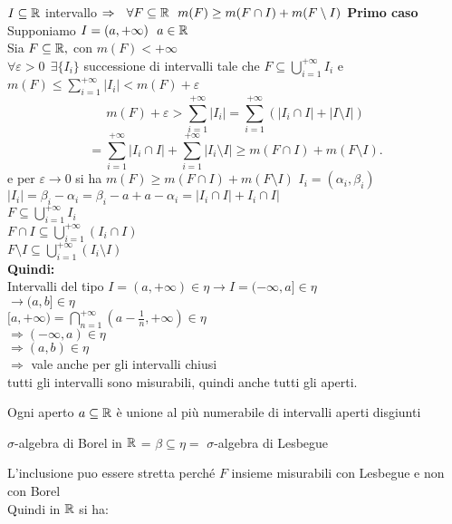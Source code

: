 \documentclass[12px]{article}
\begin{document}
\begin{dimo}
	$I\subseteq \mathbb{R}$ intervallo  $ \Rightarrow \ \ \forall F\subseteq \mathbb{R} \ \ m(F)\geq m(F\cap I) + m(F\setminus I)$ 
\textbf{Primo caso}\\
Supponiamo $I = (a,+\infty) \ \ a\in\R$\\
Sia  $F\subseteq \mathbb{R}, $ con $m(F) < +\infty$ \\
$\forall \varepsilon > 0 \ \ \exists \{I_i\}$ successione di intervalli tale che  $F\subseteq \bigcup^{+\infty}_{i=1}I_i$ e $m(F)\leq \sum^{+\infty}_{i=1}|I_i| < m(F) + \varepsilon$
\[
m(F) + \varepsilon > \sum^{+\infty}_{i =1}|I_i| = \sum^{+\infty}_{i=1}(|I_i\cap I| + |I\setminus I|) 
\] 
\[
= \sum^{+\infty}_{i=1}|I_i\cap I| + \sum^{+\infty}_{i=1}|I_i\setminus I| \geq m(F\cap I) + m(F\setminus I)
.\] 
e per $\varepsilon \rightarrow 0$ si ha $m(F) \geq m(F\cap I) + m(F\setminus I)$
$I_i  = (\alpha_i, \beta_i)$ \ \ $|I_i| = \beta_i -\alpha_i = \beta_i - a + a - \alpha_i = |I_i\cap I| + I_i\cap I|$\\
$F\subseteq \bigcup^{+\infty}_{i = 1}I_i$\\
$F\cap I\subseteq  \bigcup^{+\infty}_{i =1}(I_i\cap I)$\\
$F\setminus I \subseteq \bigcup^{+\infty}_{i =1}(I_i\setminus I)$ \\
\textbf{Quindi:}\\
Intervalli del tipo $I= (a,+\infty)\in \eta \rightarrow I = (-\infty, a]\in\eta$\\
$ \rightarrow (a,b]\in\eta$\\
$[a,+\infty) = \bigcap_{n=1}^{+\infty}(a - \frac 1n, +\infty)\in \eta$\\
$ \Rightarrow (-\infty , a)\in \eta$ \\
$ \Rightarrow (a,b)\in \eta$ \\
$ \Rightarrow $ vale anche per gli intervalli chiusi\\
tutti gli intervalli sono misurabili, quindi anche tutti gli aperti.
\end{dimo}
\begin{teo}
	Ogni aperto $a\subseteq\mathbb{R}$ è unione al più numerabile di intervalli aperti disgiunti
\end{teo}
\begin{coro}
	$\sigma$-algebra di Borel in $\mathbb{R}$ = $\beta\subseteq\eta = $  $\sigma$-algebra di Lesbegue
\end{coro}
L'inclusione puo essere stretta perché  $F$ insieme misurabili con Lesbegue e non con Borel\\
Quindi in $\mathbb{R}$ si ha:\\
\end{document}
